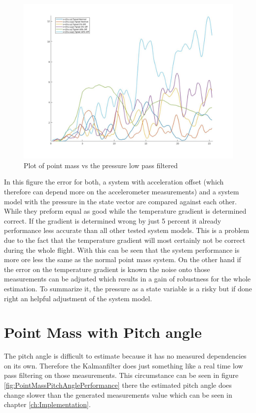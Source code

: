 \begin{figure}[h!]
 \centering
 \includegraphics[width=.8 \textwidth]{./Pictures/PointMassVSPressure.jpg}
 \caption{Plot of point mass vs the pressure low pass filtered}
 \label{fig:PointMassVSPressure}
\end{figure}

In this figure the error for both, a system with acceleration offset (which therefore can depend more on the accelerometer measurements)
and a system model with the pressure in the state vector are compared against each other.
While they preform equal as good while the temperature gradient is determined correct.
If the gradient is determined wrong by just 5 percent it already performance less accurate than all other tested system models.
This is a problem due to the fact that the temperature gradient will most certainly not be correct during the whole flight.
With this can be seen that the system performance is more ore less the same as the normal point mass system.
On the other hand if the error on the temperature gradient is known the noise onto those measurements can be adjusted which
results in a gain of robustness for the whole estimation.
To summarize it, the pressure as a state variable is a risky but if done right an helpful adjustment of the system model.

\newpage
\section{Point Mass with Pitch angle}
The pitch angle is difficult to estimate because it has no measured dependencies on its own.
Therefore the Kalmanfilter does just something like a real time low pass filtering on those measurements.
This circumstance can be seen in figure \ref{fig:PointMassPitchAnglePerformance} there the estimated pitch angle does change slower than the generated measurements value which can be seen in chapter \ref{ch:Implementation}.

